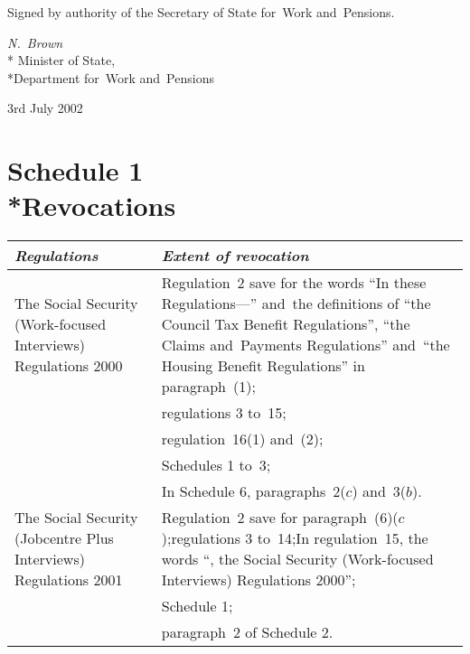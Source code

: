 \documentclass[12pt,a4paper]{article}
\begin{document}
\bigskip

Signed 
by authority of the 
Secretary of State for~Work and~Pensions.

{\raggedleft
\emph{N.~Brown}\\*
Minister
of State,\\*Department 
for~Work and~Pensions

}

3rd July 2002

\small

\enlargethispage{-\baselineskip}

\part[Schedule 1 --- Revocations]{Schedule 1\\*Revocations}

\renewcommand\parthead{--- Schedule 1}

\begin{longtable}{p{106.61865pt}p{259.3711pt}}
\hline
\itshape Regulations	& \itshape Extent of revocation\\
\hline
\endhead
\hline
\endlastfoot
\hbadness=10000 The Social Security (Work-focused Interviews) Regulations 2000	&

Regulation~2 save for the words “In these Regulations—” and~the definitions of “the Council Tax Benefit Regulations”, “the Claims and~Payments Regulations” and~“the Housing Benefit Regulations” in paragraph~(1);\\

&regulations 3 to~15;\\

&regulation~16(1) and~(2);\\

&Schedules 1 to~3;\\

&In Schedule 6, paragraphs~2($c$)  and~3($b$).\\

\hbadness=6348 The Social Security (Jobcentre Plus Interviews) Regulations 2001	
&
Regulation~2 save for paragraph~(6)($c$);\newline regulations 3 to~14;\newline In regulation~15, the words “, the Social Security (Work-focused Interviews) Regulations 2000”;\\

&Schedule 1;\\

&paragraph~2 of Schedule 2.\\
\end{longtable}
\end{document}

